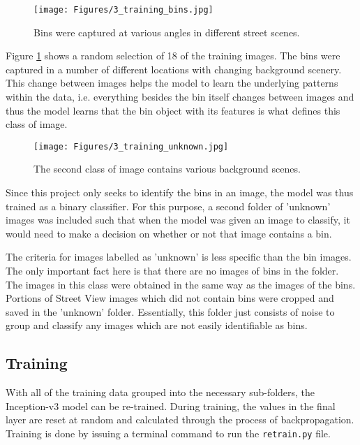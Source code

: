 \begin{figure}[H]
\centering
\texttt{[image: Figures/3\_training\_bins.jpg]}
\decoRule
\caption[Training Imagery]{Bins were captured at various angles in different street scenes.}
\label{fig:training_imagery}
\end{figure}

Figure \ref{fig:training_imagery} shows a random selection of 18 of the training images. The bins were captured in a number of different locations with changing background scenery. This change between images helps the model to learn the underlying patterns within the data, i.e. everything besides the bin itself changes between images and thus the model learns that the bin object with its features is what defines this class of image.

\begin{figure}[H]
\centering
\texttt{[image: Figures/3\_training\_unknown.jpg]}
\decoRule
\caption[Training Imagery 2]{The second class of image contains various background scenes.}
\label{fig:training_imagery2}
\end{figure}

Since this project only seeks to identify the bins in an image, the model was thus trained as a binary classifier. For this purpose, a second folder of 'unknown' images was included such that when the model was given an image to classify, it would need to make a decision on whether or not that image contains a bin.

The criteria for images labelled as 'unknown' is less specific than the bin images. The only important fact here is that there are no images of bins in the folder. The images in this class were obtained in the same way as the images of the bins. Portions of Street View images which did not contain bins were cropped and saved in the 'unknown' folder. Essentially, this folder just consists of noise to group and classify any images which are not easily identifiable as bins.

\subsection{Training}
With all of the training data grouped into the necessary sub-folders, the Inception-v3 model can be re-trained. During training, the values in the final layer are reset at random and calculated through the process of backpropagation. Training is done by issuing a terminal command to run the \verb|retrain.py| file.

